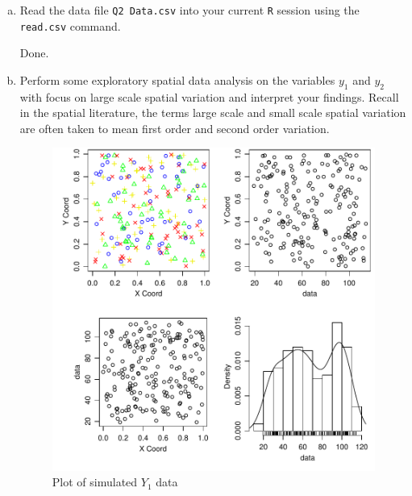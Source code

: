 \documentclass[letterpaper, 12pt]{article}\usepackage[]{graphicx}\usepackage[]{color}
\makeatletter
\def\maxwidth{ %
  \ifdim\Gin@nat@width>\linewidth
    \linewidth
  \else
    \Gin@nat@width
  \fi
}
\newenvironment{knitrout}{}{} %
\makeatother
\begin{document}
\begin{enumerate}[(a)]
\item
Read the data file \texttt{Q2 Data.csv} into your current \texttt{R} session using the \texttt{read.csv} command.

\textsf{Done}.
\item
Perform some exploratory spatial data analysis on the variables $y_1$ and $y_2$ with focus on large scale spatial variation and interpret your findings. Recall in the spatial literature, the terms large scale and small scale spatial variation are often taken to mean first order and second order variation.




\begin{knitrout}
\color{fgcolor}\begin{figure}[]

\includegraphics[width=\maxwidth]{figure/plot1} \caption[Plot of simulated $Y_1$ data]{Plot of simulated $Y_1$ data\label{fig:plot1}}
\end{figure}


\end{knitrout}


\begin{knitrout}
\color{fgcolor}\begin{figure}[]


\end{figure}
\end{knitrout}
\end{enumerate}
\end{document}
